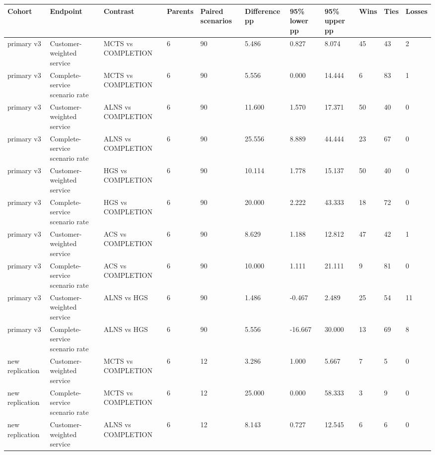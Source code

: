 \begin{tabular}{lllllllllll}
\hline
Cohort & Endpoint & Contrast & Parents & Paired scenarios & Difference pp & 95\% lower pp & 95\% upper pp & Wins & Ties & Losses \\
\hline
primary v3 & Customer-weighted service & MCTS vs COMPLETION & 6 & 90 & 5.486 & 0.827 & 8.074 & 45 & 43 & 2 \\
primary v3 & Complete-service scenario rate & MCTS vs COMPLETION & 6 & 90 & 5.556 & 0.000 & 14.444 & 6 & 83 & 1 \\
primary v3 & Customer-weighted service & ALNS vs COMPLETION & 6 & 90 & 11.600 & 1.570 & 17.371 & 50 & 40 & 0 \\
primary v3 & Complete-service scenario rate & ALNS vs COMPLETION & 6 & 90 & 25.556 & 8.889 & 44.444 & 23 & 67 & 0 \\
primary v3 & Customer-weighted service & HGS vs COMPLETION & 6 & 90 & 10.114 & 1.778 & 15.137 & 50 & 40 & 0 \\
primary v3 & Complete-service scenario rate & HGS vs COMPLETION & 6 & 90 & 20.000 & 2.222 & 43.333 & 18 & 72 & 0 \\
primary v3 & Customer-weighted service & ACS vs COMPLETION & 6 & 90 & 8.629 & 1.188 & 12.812 & 47 & 42 & 1 \\
primary v3 & Complete-service scenario rate & ACS vs COMPLETION & 6 & 90 & 10.000 & 1.111 & 21.111 & 9 & 81 & 0 \\
primary v3 & Customer-weighted service & ALNS vs HGS & 6 & 90 & 1.486 & -0.467 & 2.489 & 25 & 54 & 11 \\
primary v3 & Complete-service scenario rate & ALNS vs HGS & 6 & 90 & 5.556 & -16.667 & 30.000 & 13 & 69 & 8 \\
new replication & Customer-weighted service & MCTS vs COMPLETION & 6 & 12 & 3.286 & 1.000 & 5.667 & 7 & 5 & 0 \\
new replication & Complete-service scenario rate & MCTS vs COMPLETION & 6 & 12 & 25.000 & 0.000 & 58.333 & 3 & 9 & 0 \\
new replication & Customer-weighted service & ALNS vs COMPLETION & 6 & 12 & 8.143 & 0.727 & 12.545 & 6 & 6 & 0 \\

\end{tabular}

